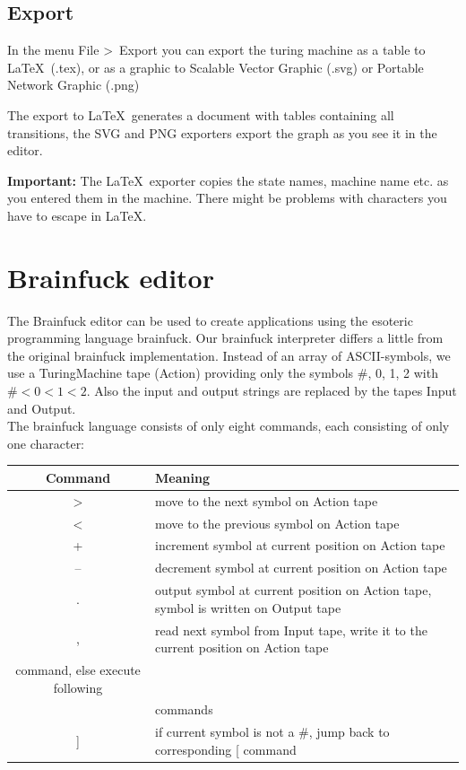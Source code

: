 \documentclass[%
  a4paper,%
  11pt,%
  blue,%
  hyperref	%
  ]{tubsartcl}
\begin{document}
\subsection{Export}
\label{sec:export}
In the menu File \textgreater \ Export you can export the turing machine as a table to \LaTeX\ (.tex), or as a graphic to Scalable Vector Graphic (.svg) or Portable Network Graphic (.png)

The export to \LaTeX\ generates a document with tables containing all transitions, the SVG and PNG exporters export the graph as you see it in the editor.

\textbf{Important:} The \LaTeX\ exporter copies the state names, machine name etc. as you entered them in the machine. There might be problems with characters you have to escape in \LaTeX. 

\clearpage

\section{Brainfuck editor}
\label{sec:brainfuck-editor}
The Brainfuck editor  can be used to create applications using the esoteric programming language brainfuck. Our brainfuck interpreter differs a little from the original brainfuck implementation. Instead of an array of ASCII-symbols, we use a TuringMachine tape (Action) providing only the symbols \#, 0, 1, 2 with $\# < 0 < 1 < 2$. Also the input and output strings are replaced by the tapes Input and Output.\\

The brainfuck language consists of only eight commands, each consisting of only one character:\\

\begin{tabular}{|c|l|}
\hline
\textbf{Command} & \textbf{Meaning} \\
\hline
$>$ & move to the next symbol on Action tape \\
\hline
$<$ & move to the previous symbol on Action tape \\
\hline
+ & increment symbol at current position on Action tape \\
\hline
-- & decrement symbol at current position on Action tape \\
\hline
. & output symbol at current position on Action tape, symbol is written on Output tape \\
\hline
, & read next symbol from Input tape, write it to the current position on Action tape \\
\hline
[ & if current symbol is a \#, move to corresponding ] command, else execute following\\
\ & commands \\
\hline
] & if current symbol is not a \#, jump back to corresponding [ command \\
\hline
\end{tabular}
\end{document}
